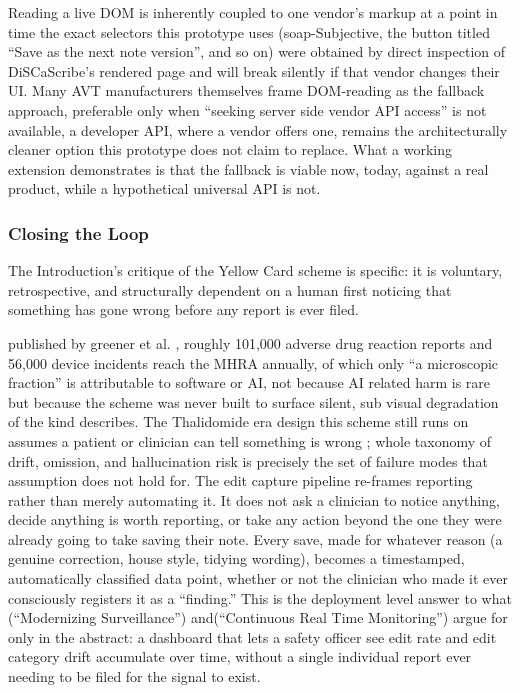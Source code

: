 \documentclass[11pt,a4paper]{article}
\begin{document}
Reading a live DOM is inherently coupled to one vendor’s markup at a point in time the exact selectors this prototype uses (soap-Subjective, the button titled “Save as the next note version”, and so on) were obtained by direct inspection of DiSCaScribe’s rendered page and will break silently if that vendor changes their UI.  Many AVT manufacturers themselves frame DOM-reading as the fallback approach, preferable only when “seeking server side vendor API access” is not available, a developer API, where a vendor offers one, remains the architecturally cleaner option this prototype does not claim to replace. What a working extension demonstrates is that the fallback is viable now, today, against a real product, while a hypothetical universal API is not.

\subsubsection{Closing the Loop}

The Introduction’s critique of the Yellow Card scheme is specific: it is voluntary, retrospective, and structurally dependent on a human first noticing that something has gone wrong before any report is ever filed.

published by greener et al.\cite{greener2017} , roughly 101,000 adverse drug reaction reports and 56,000 device incidents reach the MHRA annually, of which only “a microscopic fraction” is attributable to software or AI, not because AI related harm is rare but because the scheme was never built to surface silent, sub visual degradation of the kind describes. The Thalidomide era design this scheme still runs on assumes a patient or clinician can tell something is wrong \cite{greener2017} ;  whole taxonomy of drift, omission, and hallucination risk is precisely the set of failure modes that assumption does not hold for. 
The edit capture pipeline re-frames reporting rather than merely automating it. It does not ask a clinician to notice anything, decide anything is worth reporting, or take any action beyond the one they were already going to take saving their note. Every save, made for whatever reason (a genuine correction, house style, tidying wording), becomes a timestamped, automatically classified data point, whether or not the clinician who made it ever consciously registers it as a “finding.” This is the deployment level answer to what (“Modernizing Surveillance”) and(“Continuous Real Time Monitoring”) argue for only in the abstract: a dashboard that lets a safety officer see edit rate and edit category drift accumulate over time, without a single individual report ever needing to be filed for the signal to exist.
\end{document}
